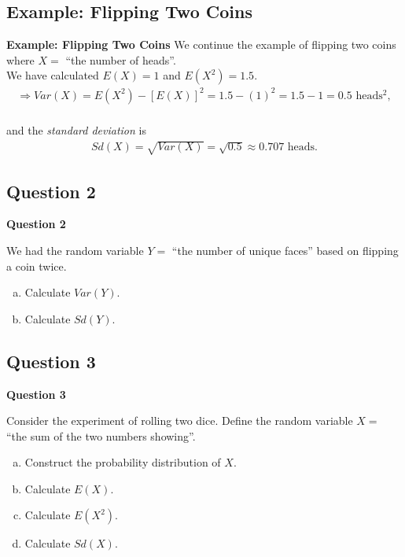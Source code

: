 \documentclass[compress]{beamer}        %
\makeatletter
\newcommand{\tcb}{\textcolor{beamer@blendedblue}}
\makeatother
\begin{document}
\subsection{Example: Flipping Two Coins}
\begin{frame}{\bf \tcb{Example: Flipping Two Coins}}
We continue the example of flipping two coins where $X =$ ``the number of heads''.\\[0.4cm]

We have calculated $E(X) = 1$ and $E(X^2) = 1.5$.\\[-0.1cm]

\begin{align*}
\Rightarrow Var(X) = E(X^2) - [E(X)]^2 = 1.5 - (1)^2 = 1.5 - 1 = 0.5 \text{ heads$^2$},\\[-0.0cm]
\end{align*}

and the \emph{standard deviation} is\\[-0.1cm]

\begin{align*}
Sd(X) = \sqrt{Var(X)} = \sqrt{0.5} \approx 0.707 \text{ heads}.
\end{align*}


\end{frame}


\subsection{Question 2}
\begin{frame}{\bf \tcb{Question 2}}

We had the random variable $Y =$ ``the number of unique faces'' based on flipping a coin twice.\\[0.3cm]

\begin{enumerate}[a)]\itemsep0.3cm
\item Calculate $Var(Y)$.
\item Calculate $Sd(Y)$.
\end{enumerate}

\end{frame}



\subsection{Question 3}
\begin{frame}{\bf \tcb{Question 3}}

Consider the experiment of rolling two dice. Define the random variable $X = $ ``the sum of the two numbers showing''.\\[0.3cm]


\begin{enumerate}[a)]\itemsep0.3cm
\item Construct the probability distribution of $X$.
\item Calculate $E(X)$.
\item Calculate $E(X^2)$.
\item Calculate $Sd(X)$.
\end{enumerate}

\end{frame}
\end{document}
